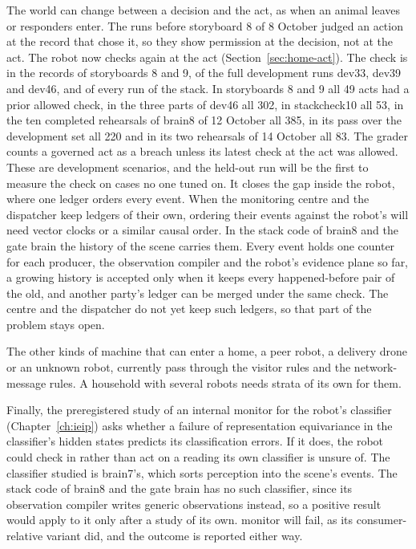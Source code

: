 The world can change between a decision and the act, as when an animal leaves or responders enter.
The runs before storyboard 8 of 8 October judged an action at the record that chose it, so they
show permission at the decision, not at the act. The robot now checks again at the act
(Section~\ref{sec:home-act}).
The check is in the records of storyboards 8 and 9, of the full development runs dev33, dev39 and
dev46, and of every run of the stack.
In storyboards 8 and 9 all 49 acts had a prior allowed check, in the three parts of dev46 all 302,
in stackcheck10 all 53, in the ten completed rehearsals of brain8 of 12 October all 385, in its
pass over the development set all 220 and in its two rehearsals of 14 October all 83.
The grader counts a governed act as a breach unless its latest check at the act was allowed.
These are development scenarios, and the held-out run will be the first to measure the check on
cases no one tuned on. It closes the gap inside the robot, where one ledger
orders every event. When the monitoring centre and the dispatcher keep ledgers of their own,
ordering their events against the robot's will need vector clocks or a similar causal order.
In the stack code of brain8 and the gate brain the history of the scene carries them.
Every event holds one counter for each producer, the observation compiler and the robot's evidence
plane so far, a growing history is accepted only when it keeps every happened-before pair of the
old, and another party's ledger can be merged under the same check.
The centre and the dispatcher do not yet keep such ledgers, so that part of the problem stays open.

The other kinds of machine that can enter a home, a peer robot, a delivery drone or an unknown
robot, currently pass through the visitor rules and the network-message rules. A household with
several robots needs strata of its own for them.

Finally, the preregistered study of an internal monitor for the robot's classifier
(Chapter~\ref{ch:ieip}) asks whether a failure of representation equivariance in the classifier's
hidden states predicts its classification errors. If it does, the robot could check in rather than
act on a reading its own classifier is unsure of.
The classifier studied is brain7's, which sorts perception into the scene's events.
The stack code of brain8 and the gate brain has no such classifier, since its observation compiler writes generic observations instead,
so a positive result would apply to it only after a study of its own.
monitor will fail, as its consumer-relative variant did, and the outcome is reported either way.
